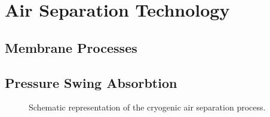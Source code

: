 \chapter{Air Separation Technology}
\label{chp:airsep}

\section{Membrane Processes}
\label{sec:membrane}

\section{Pressure Swing Absorbtion}
\label{sec:psa}

\begin{figure}
	
	\caption[Air Separation Unit]{Schematic representation of the cryogenic air separation process.}
\end{figure}